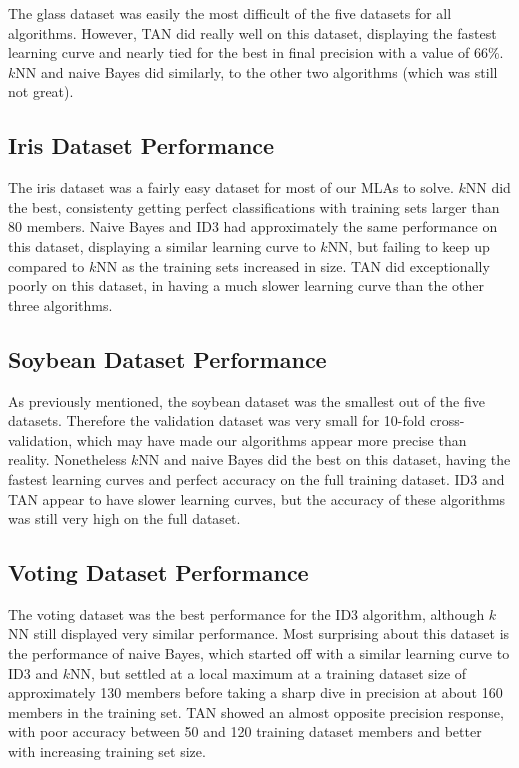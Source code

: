 \documentclass{article}
\begin{document}
			The glass dataset was easily the most difficult of the five datasets for all algorithms. However, TAN did really well on this dataset, displaying the fastest learning curve and nearly tied for the best in final precision with a value of 66\%. $k$NN and naive Bayes did similarly, to the other two algorithms (which was still not great).
		
		\subsection{Iris Dataset Performance}
		
			The iris dataset was a fairly easy dataset for most of our MLAs to solve. $k$NN did the best, consistenty getting perfect classifications with training sets larger than 80 members. Naive Bayes and ID3 had approximately the same performance on this dataset, displaying a similar learning curve to $k$NN, but failing to keep up compared to $k$NN as the training sets increased in size. TAN did exceptionally poorly on this dataset, in having a much slower learning curve than the other three algorithms.
		
		\subsection{Soybean Dataset Performance}
		
			As previously mentioned, the soybean dataset was the smallest out of the five datasets. Therefore the validation dataset was very small for 10-fold cross-validation, which may have made our algorithms appear more precise than reality. Nonetheless $k$NN and naive Bayes did the best on this dataset, having the fastest learning curves and perfect accuracy on the full training dataset. ID3 and TAN appear to have slower learning curves, but the accuracy of these algorithms was still very high on the full dataset.
		
		\subsection{Voting Dataset Performance}
		
			The voting dataset was the best performance for the ID3 algorithm, although $k$NN still displayed very similar performance. Most surprising about this dataset is the performance of naive Bayes, which started off with a similar learning curve to ID3 and $k$NN, but settled at a local maximum at a training dataset size of approximately 130 members before taking a sharp dive in precision at about 160 members in the training set. TAN showed an almost opposite precision response, with poor accuracy between 50 and 120 training dataset members and better with increasing training set size.
\end{document}
